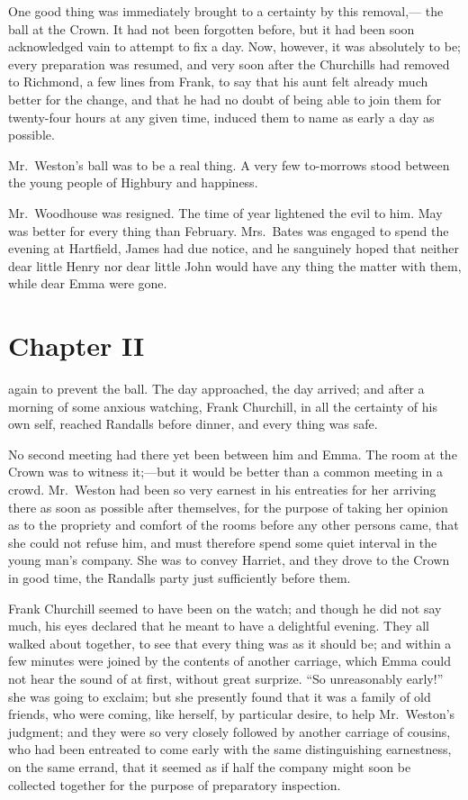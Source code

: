 One good thing was immediately brought to a certainty by this removal,---%
the ball at the Crown.  It had not been forgotten before, but it had
been soon acknowledged vain to attempt to fix a day.  Now, however,
it was absolutely to be; every preparation was resumed, and very soon
after the Churchills had removed to Richmond, a few lines from Frank,
to say that his aunt felt already much better for the change,
and that he had no doubt of being able to join them for twenty-four
hours at any given time, induced them to name as early a day as possible.

Mr.\ Weston's ball was to be a real thing.  A very few to-morrows
stood between the young people of Highbury and happiness.

Mr.\ Woodhouse was resigned.  The time of year lightened the evil
to him.  May was better for every thing than February.  Mrs.\ Bates
was engaged to spend the evening at Hartfield, James had due notice,
and he sanguinely hoped that neither dear little Henry nor dear
little John would have any thing the matter with them, while dear
Emma were gone.



\chapter{Chapter II}


 again to prevent the ball.  The day approached,
the day arrived; and after a morning of some anxious watching,
Frank Churchill, in all the certainty of his own self, reached Randalls
before dinner, and every thing was safe.

No second meeting had there yet been between him and Emma.
The room at the Crown was to witness it;---but it would be better
than a common meeting in a crowd.  Mr.\ Weston had been so very
earnest in his entreaties for her arriving there as soon as possible
after themselves, for the purpose of taking her opinion as to the
propriety and comfort of the rooms before any other persons came,
that she could not refuse him, and must therefore spend some quiet
interval in the young man's company.  She was to convey Harriet,
and they drove to the Crown in good time, the Randalls party just
sufficiently before them.

Frank Churchill seemed to have been on the watch; and though
he did not say much, his eyes declared that he meant to have
a delightful evening.  They all walked about together, to see
that every thing was as it should be; and within a few minutes
were joined by the contents of another carriage, which Emma
could not hear the sound of at first, without great surprize.
``So unreasonably early!'' she was going to exclaim; but she presently
found that it was a family of old friends, who were coming, like herself,
by particular desire, to help Mr.\ Weston's judgment; and they were
so very closely followed by another carriage of cousins, who had been
entreated to come early with the same distinguishing earnestness,
on the same errand, that it seemed as if half the company might
soon be collected together for the purpose of preparatory inspection.

